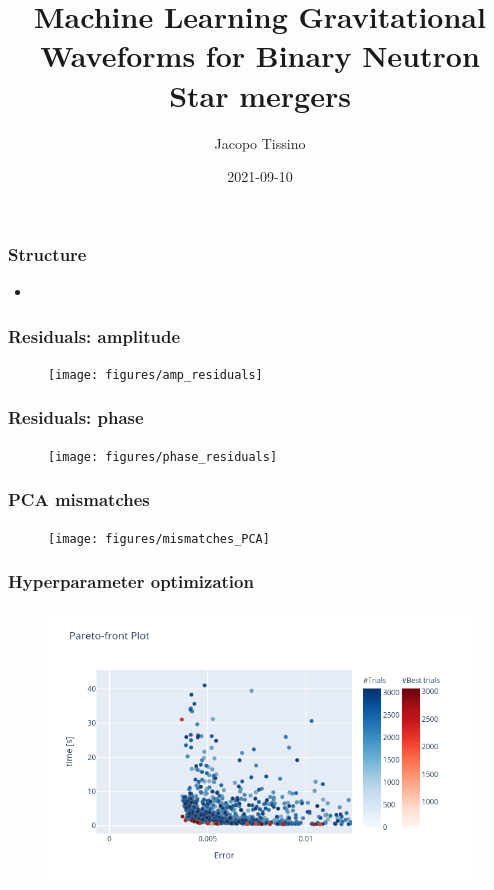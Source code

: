 \documentclass{beamer}
\title{Machine Learning Gravitational Waveforms for Binary Neutron Star mergers}
\author{Jacopo Tissino}
\date{2021-09-10}
\begin{document}
\frame{\titlepage}

\begin{frame}
    \frametitle{Structure}
    \begin{itemize}
    \item 
    \end{itemize}
\end{frame}

\begin{frame}
    \frametitle{Residuals: amplitude}
    \begin{figure}[ht]
    \centering
    \texttt{[image: figures/amp\_residuals]}
    \label{fig:amp_residuals}
    \end{figure}
\end{frame}

\begin{frame}
    \frametitle{Residuals: phase}
    \begin{figure}[ht]
    \centering
    \texttt{[image: figures/phase\_residuals]}
    \label{fig:phase_residuals}
    \end{figure}
\end{frame}

\begin{frame}
    \frametitle{PCA mismatches}
    \begin{figure}[ht]
    \centering
    \texttt{[image: figures/mismatches\_PCA]}
    \label{fig:mismatches_PCA}
    \end{figure}
\end{frame}

\begin{frame}
    \frametitle{Hyperparameter optimization}
    \begin{figure}[ht]
    \centering
    \includegraphics[width=\textwidth]{figures/pareto-front-nonspinning}
    \label{fig:pareto-front-nonspinning}
    \end{figure}
\end{frame}
\end{document}
